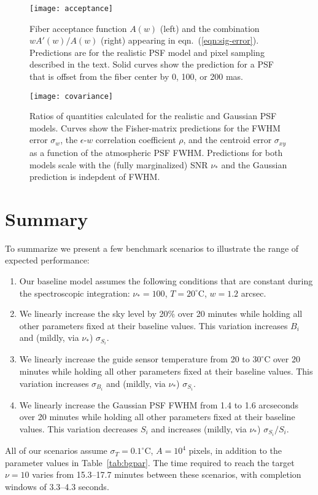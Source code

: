 \documentclass[11pt]{article}
\providecommand{\eqn}[1]{eqn.~(\ref{eqn:#1})}
\providecommand{\tab}[1]{Table~\ref{tab:#1}}
\begin{document}
\begin{figure}[htb]
\begin{center}
\texttt{[image: acceptance]}
\caption{Fiber acceptance function $A(w)$ (left) and the combination $w A'(w)/A(w)$ (right) appearing in \eqn{sig-error}. Predictions are for the realistic PSF model and pixel sampling described in the text. Solid curves show the prediction for a PSF that is offset from the fiber center by 0, 100, or 200 mas.}
\label{fig:acceptance}
\end{center}
\end{figure}

\begin{figure}[h]
\begin{center}
\texttt{[image: covariance]}
\caption{Ratios of quantities calculated for the realistic and Gaussian PSF models.  Curves show the Fisher-matrix predictions for the FWHM error $\sigma_w$, the $\epsilon$-$w$ correlation coefficient $\rho$, and the centroid error $\sigma_{xy}$ as a function of the atmospheric PSF FWHM. Predictions for both models scale with the (fully marginalized) SNR $\nu_\ast$ and the Gaussian prediction is indepdent of FWHM.}
\label{fig:covariance}
\end{center}
\end{figure}

\section{Summary}

To summarize we present a few benchmark scenarios to illustrate the range of expected performance:
\begin{enumerate}
\item Our baseline model assumes the following conditions that are constant during the spectroscopic integration: $\nu_{\ast} = 100$, $T = 20^\circ$C, $w = 1.2$ arcsec.
\item We linearly increase the sky level by 20\% over 20 minutes while holding all other parameters fixed at their baseline values. This variation increases $B_i$ and (mildly, via $\nu_{\ast}$) $\sigma_{S_i}$.
\item We linearly increase the guide sensor temperature from 20 to $30^\circ$C over 20 minutes while holding all other parameters fixed at their baseline values. This variation increases $\sigma_{B_i}$ and (mildly, via $\nu_{\ast}$) $\sigma_{S_i}$.
\item We linearly increase the Gaussian PSF FWHM from 1.4 to 1.6 arcseconds over 20 minutes while holding all other parameters fixed at their baseline values. This variation decreases $S_i$ and increases (mildly, via $\nu_{\ast}$) $\sigma_{S_i}/S_i$.
\end{enumerate}
All of our scenarios assume $\sigma_T = 0.1^\circ$C, $A = 10^4$ pixels, in addition to the parameter values in \tab{bgpar}. The time required to reach the target $\nu = 10$ varies from 15.3--17.7 minutes between these scenarios, with completion windows of 3.3--4.3 seconds.
\end{document}
